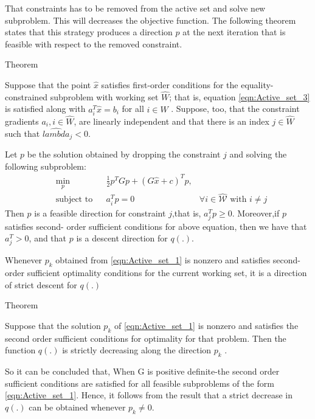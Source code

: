 That constraints has to be removed from the active set and solve new subproblem. This will decreases the objective function. The following theorem states that this strategy produces a direction $p$ at the next iteration  that is feasible with respect to the removed constraint.
\begin{mybox}{Theorem}
\begin{theorem}
	Suppose that the point $\hat{x}$ satisfies first-order conditions for the equality-constrained subproblem with working set $\hat{W}$; that is, equation \ref{eqn:Active_set_3} is satisfied along with $a_i^T\hat{x}=b_i$ for all $i\in \hat{W}$ . Suppose, too, that the constraint gradients $a_i,i\in \hat{W}$, are linearly independent and that there is an index $j\in \hat{W}$ such that $\hat{lambda}_j<0$. 
	
	Let $p$ be the solution obtained by dropping the constraint $j$ and solving the following subproblem:
	\begin{equation}
	\begin{aligned}
		& \underset{p}{\text{min}} & & \frac{1}{2}p^{T}Gp+(G\hat{x}+c)^{T}p, \\
& \text{subject to} & &  a_{i}^{T}p = 0 & \forall i\in \hat{\mathcal{W}} \text{ with } i\neq j
	\end{aligned}
	\label{eqn:Active_set_5}
\end{equation}
Then $p$ is a feasible direction for constraint $j$,that is, $a_j^Tp \geqslant 0$. Moreover,if $p$ satisfies second- order sufficient conditions for above equation, then we have that $a_j^T > 0$, and that $p$ is a descent direction for $q(.)$.
\end{theorem}
\end{mybox}
Whenever $p_k$ obtained from \ref{eqn:Active_set_1} is nonzero and satisfies second-order sufficient optimality conditions for the current working set, it is a direction of strict descent for $q(.)$


\begin{mybox}{Theorem}
\begin{theorem}
	Suppose that the solution $p_k$ of \ref{eqn:Active_set_1} is nonzero and satisfies the second order sufficient conditions for optimality for that problem. Then the function $q(.)$ is strictly decreasing along the direction $p_k$ .
\end{theorem}
\end{mybox}

So it can be concluded that, When G is positive definite-the second order sufficient conditions are satisfied for all feasible subproblems of the form \ref{eqn:Active_set_1}. Hence, it follows from the result that a strict decrease in $q(.)$ can be obtained whenever $p_k \neq 0$.

